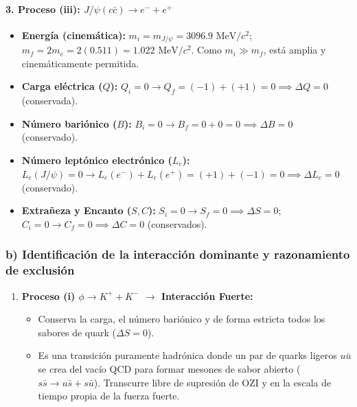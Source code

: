 \begin{problema}
\paragraph{3. Proceso (iii): $J/\psi(c\bar{c}) \longrightarrow e^- + e^+$}
\begin{itemize}
    \item \textbf{Energía (cinemática):} $m_i = m_{J/\psi} = 3096.9\text{ MeV}/c^2$; $m_f = 2 m_e = 2(0.511) = 1.022\text{ MeV}/c^2$. Como $m_i \gg m_f$, está amplia y cinemáticamente permitida.
    \item \textbf{Carga eléctrica ($Q$):} $Q_i = 0 \to Q_f = (-1) + (+1) = 0 \implies \Delta Q = 0$ (conservada).
    \item \textbf{Número bariónico ($B$):} $B_i = 0 \to B_f = 0 + 0 = 0 \implies \Delta B = 0$ (conservado).
    \item \textbf{Número leptónico electrónico ($L_e$):} $L_e(J/\psi) = 0 \to L_e(e^-) + L_e(e^+) = (+1) + (-1) = 0 \implies \Delta L_e = 0$ (conservado).
    \item \textbf{Extrañeza y Encanto ($S, C$):} $S_i = 0 \to S_f = 0 \implies \Delta S = 0$; $C_i = 0 \to C_f = 0 \implies \Delta C = 0$ (conservados).
\end{itemize}

\subsubsection*{b) Identificación de la interacción dominante y razonamiento de exclusión}

\begin{enumerate}[label=\arabic*.]
    \item \textbf{Proceso (i) $\phi \rightarrow K^+ + K^-$ $\longrightarrow$ Interacción Fuerte:}
    \begin{itemize}
        \item Conserva la carga, el número bariónico y de forma estricta todos los sabores de quark ($\Delta S = 0$).
        \item Es una transición puramente hadrónica donde un par de quarks ligeros $u\bar{u}$ se crea del vacío QCD para formar mesones de sabor abierto ($s\bar{s} \to u\bar{s} + s\bar{u}$). Transcurre libre de supresión de OZI y en la escala de tiempo propia de la fuerza fuerte.
    \end{itemize}


\end{enumerate}
\end{problema}
